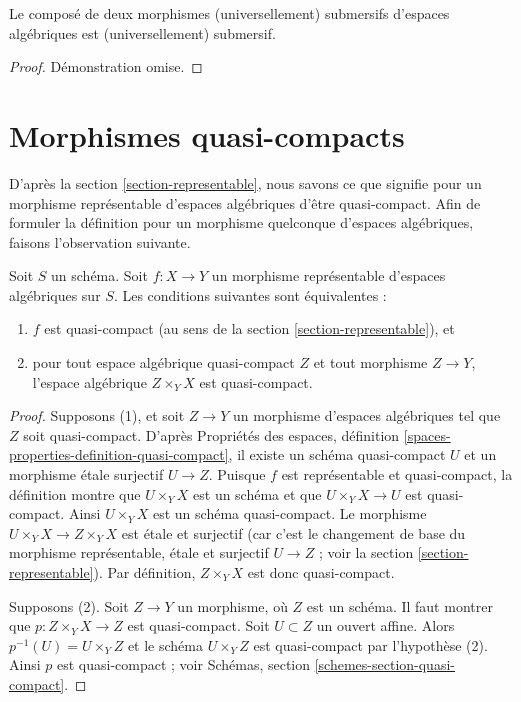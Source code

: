 \begin{lemma}
\label{lemma-composition-universally-submersive}
Le composé de deux morphismes (universellement) submersifs
d'espaces algébriques est (universellement) submersif.
\end{lemma}

\begin{proof}
Démonstration omise.
\end{proof}












\section{Morphismes quasi-compacts}
\label{section-quasi-compact}

\noindent
D'après la section \ref{section-representable}, nous savons ce que signifie
pour un morphisme représentable d'espaces algébriques d'être quasi-compact.
Afin de formuler la définition pour un morphisme quelconque
d'espaces algébriques, faisons l'observation suivante.

\begin{lemma}
\label{lemma-characterize-representable-quasi-compact}
Soit $S$ un schéma.
Soit $f : X \to Y$ un morphisme représentable d'espaces algébriques sur $S$.
Les conditions suivantes sont équivalentes :
\begin{enumerate}
\item $f$ est quasi-compact
(au sens de la section \ref{section-representable}), et
\item pour tout espace algébrique quasi-compact $Z$ et tout morphisme
$Z \to Y$, l'espace algébrique $Z \times_Y X$ est quasi-compact.
\end{enumerate}
\end{lemma}

\begin{proof}
Supposons (1), et soit $Z \to Y$ un morphisme d'espaces algébriques tel que
$Z$ soit quasi-compact. D'après
Propriétés des espaces,
définition \ref{spaces-properties-definition-quasi-compact},
il existe un schéma quasi-compact $U$ et un morphisme \'etale surjectif
$U \to Z$. Puisque $f$ est représentable et quasi-compact,
la définition montre que $U \times_Y X$ est un schéma et que
$U \times_Y X \to U$ est quasi-compact. Ainsi $U \times_Y X$ est
un schéma quasi-compact. Le morphisme $U \times_Y X \to Z \times_Y X$
est \'etale et surjectif (car c'est le changement de base du morphisme
représentable, \'etale et surjectif $U \to Z$ ; voir la
section \ref{section-representable}).
Par définition, $Z \times_Y X$ est donc quasi-compact.

\medskip\noindent
Supposons (2). Soit $Z \to Y$ un morphisme, où $Z$ est un schéma.
Il faut montrer que $p : Z \times_Y X \to Z$ est quasi-compact.
Soit $U \subset Z$ un ouvert affine. Alors $p^{-1}(U) = U \times_Y Z$
et le schéma $U \times_Y Z$ est quasi-compact par l'hypothèse (2).
Ainsi $p$ est quasi-compact ; voir
Schémas, section \ref{schemes-section-quasi-compact}.
\end{proof}

